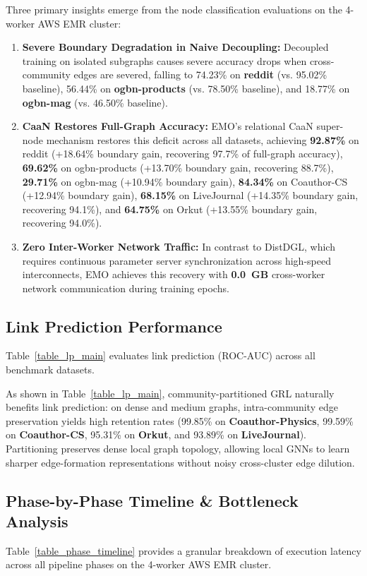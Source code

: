 \documentclass[conference,compsoc]{IEEEtran}
\begin{document}
Three primary insights emerge from the node classification evaluations on the 4-worker AWS EMR cluster:
\begin{enumerate}
    \item \textbf{Severe Boundary Degradation in Naive Decoupling:} Decoupled training on isolated subgraphs causes severe accuracy drops when cross-community edges are severed, falling to 74.23\% on \textbf{reddit} (vs. 95.02\% baseline), 56.44\% on \textbf{ogbn-products} (vs. 78.50\% baseline), and 18.77\% on \textbf{ogbn-mag} (vs. 46.50\% baseline).
    \item \textbf{CaaN Restores Full-Graph Accuracy:} EMO's relational CaaN super-node mechanism restores this deficit across all datasets, achieving \textbf{92.87\%} on reddit (+18.64\% boundary gain, recovering 97.7\% of full-graph accuracy), \textbf{69.62\%} on ogbn-products (+13.70\% boundary gain, recovering 88.7\%), \textbf{29.71\%} on ogbn-mag (+10.94\% boundary gain), \textbf{84.34\%} on Coauthor-CS (+12.94\% boundary gain), \textbf{68.15\%} on LiveJournal (+14.35\% boundary gain, recovering 94.1\%), and \textbf{64.75\%} on Orkut (+13.55\% boundary gain, recovering 94.0\%).
    \item \textbf{Zero Inter-Worker Network Traffic:} In contrast to DistDGL, which requires continuous parameter server synchronization across high-speed interconnects, EMO achieves this recovery with \textbf{0.0~GB} cross-worker network communication during training epochs.
\end{enumerate}

\subsection{Link Prediction Performance}
Table~\ref{table_lp_main} evaluates link prediction (ROC-AUC) across all benchmark datasets.



As shown in Table~\ref{table_lp_main}, community-partitioned GRL naturally benefits link prediction: on dense and medium graphs, intra-community edge preservation yields high retention rates (99.85\% on \textbf{Coauthor-Physics}, 99.59\% on \textbf{Coauthor-CS}, 95.31\% on \textbf{Orkut}, and 93.89\% on \textbf{LiveJournal}). Partitioning preserves dense local graph topology, allowing local GNNs to learn sharper edge-formation representations without noisy cross-cluster edge dilution.

\subsection{Phase-by-Phase Timeline \& Bottleneck Analysis}
Table~\ref{table_phase_timeline} provides a granular breakdown of execution latency across all pipeline phases on the 4-worker AWS EMR cluster.
\end{document}
